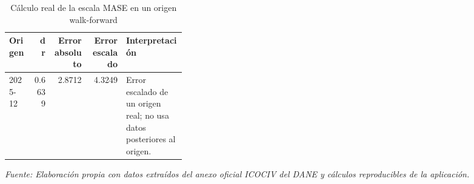 \begin{table}[H]
\centering
\caption{Cálculo real de la escala MASE en un origen walk-forward}
\label{tab:ejemplo_mase_vias_urbanas}
\scriptsize
\begin{adjustbox}{max width=\linewidth}
\begin{tabular}{lrrrp{0.34\linewidth}}
\toprule
Origen & d r & Error absoluto & Error escalado & Interpretación \\
\midrule
2025-12 & 0.6639 & 2.8712 & 4.3249 & Error escalado de un origen real; no usa datos posteriores al origen. \\
\bottomrule
\end{tabular}
\end{adjustbox}
\par\footnotesize\textit{Fuente: Elaboración propia con datos extraídos del anexo oficial ICOCIV del DANE y cálculos reproducibles de la aplicación.}
\end{table}
